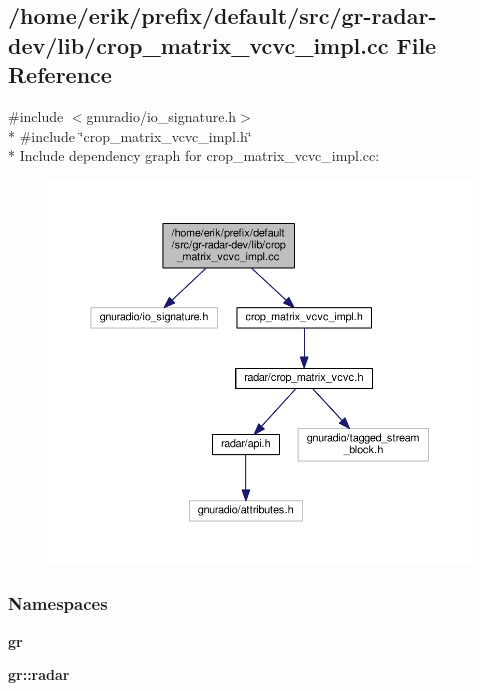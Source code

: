 \subsection{/home/erik/prefix/default/src/gr-\/radar-\/dev/lib/crop\+\_\+matrix\+\_\+vcvc\+\_\+impl.cc File Reference}
\label{crop__matrix__vcvc__impl_8cc}
{\ttfamily \#include $<$gnuradio/io\+\_\+signature.\+h$>$}\\*
{\ttfamily \#include \char`\"{}crop\+\_\+matrix\+\_\+vcvc\+\_\+impl.\+h\char`\"{}}\\*
Include dependency graph for crop\+\_\+matrix\+\_\+vcvc\+\_\+impl.\+cc\+:
\nopagebreak
\begin{figure}[H]
\begin{center}
\leavevmode
\includegraphics[width=350pt]{df/d25/crop__matrix__vcvc__impl_8cc__incl}
\end{center}
\end{figure}
\subsubsection*{Namespaces}
\begin{DoxyCompactItemize}
\item 
 {\bf gr}
\item 
 {\bf gr\+::radar}
\end{DoxyCompactItemize}
